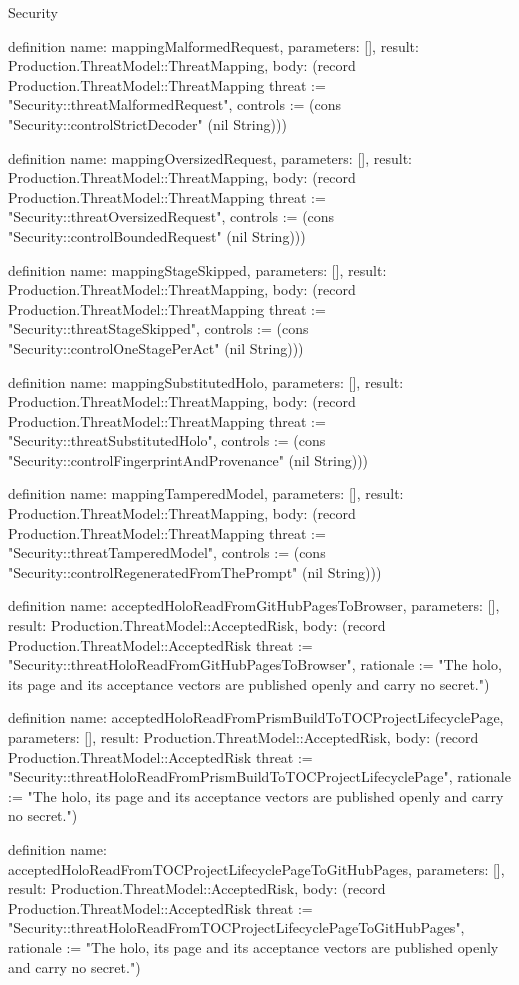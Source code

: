 \begin{lexlean}{Security}
\begin{semanticmodule}
definition{
  name: mappingMalformedRequest,
  parameters: [],
  result: Production.ThreatModel::ThreatMapping,
  body: (record Production.ThreatModel::ThreatMapping {threat := "Security::threatMalformedRequest", controls := (cons "Security::controlStrictDecoder" (nil String))})
}

definition{
  name: mappingOversizedRequest,
  parameters: [],
  result: Production.ThreatModel::ThreatMapping,
  body: (record Production.ThreatModel::ThreatMapping {threat := "Security::threatOversizedRequest", controls := (cons "Security::controlBoundedRequest" (nil String))})
}

definition{
  name: mappingStageSkipped,
  parameters: [],
  result: Production.ThreatModel::ThreatMapping,
  body: (record Production.ThreatModel::ThreatMapping {threat := "Security::threatStageSkipped", controls := (cons "Security::controlOneStagePerAct" (nil String))})
}

definition{
  name: mappingSubstitutedHolo,
  parameters: [],
  result: Production.ThreatModel::ThreatMapping,
  body: (record Production.ThreatModel::ThreatMapping {threat := "Security::threatSubstitutedHolo", controls := (cons "Security::controlFingerprintAndProvenance" (nil String))})
}

definition{
  name: mappingTamperedModel,
  parameters: [],
  result: Production.ThreatModel::ThreatMapping,
  body: (record Production.ThreatModel::ThreatMapping {threat := "Security::threatTamperedModel", controls := (cons "Security::controlRegeneratedFromThePrompt" (nil String))})
}

definition{
  name: acceptedHoloReadFromGitHubPagesToBrowser,
  parameters: [],
  result: Production.ThreatModel::AcceptedRisk,
  body: (record Production.ThreatModel::AcceptedRisk {threat := "Security::threatHoloReadFromGitHubPagesToBrowser", rationale := "The holo, its page and its acceptance vectors are published openly and carry no secret."})
}

definition{
  name: acceptedHoloReadFromPrismBuildToTOCProjectLifecyclePage,
  parameters: [],
  result: Production.ThreatModel::AcceptedRisk,
  body: (record Production.ThreatModel::AcceptedRisk {threat := "Security::threatHoloReadFromPrismBuildToTOCProjectLifecyclePage", rationale := "The holo, its page and its acceptance vectors are published openly and carry no secret."})
}

definition{
  name: acceptedHoloReadFromTOCProjectLifecyclePageToGitHubPages,
  parameters: [],
  result: Production.ThreatModel::AcceptedRisk,
  body: (record Production.ThreatModel::AcceptedRisk {threat := "Security::threatHoloReadFromTOCProjectLifecyclePageToGitHubPages", rationale := "The holo, its page and its acceptance vectors are published openly and carry no secret."})
}


\end{semanticmodule}
\end{lexlean}
